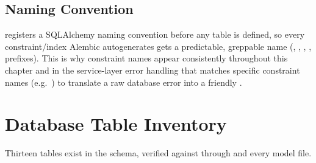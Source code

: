 \subsection*{Naming Convention}

 registers a SQLAlchemy naming convention
before any table is defined, so every constraint/index Alembic
autogenerates gets a predictable, greppable name (,
, , ,  prefixes). This is
why constraint names appear consistently throughout this chapter and in
the service-layer error handling that matches specific constraint names
(e.g.\ ) to translate
a raw database error into a friendly .

\section{Database Table Inventory}

Thirteen tables exist in the schema, verified against
 through  and every model
file.

